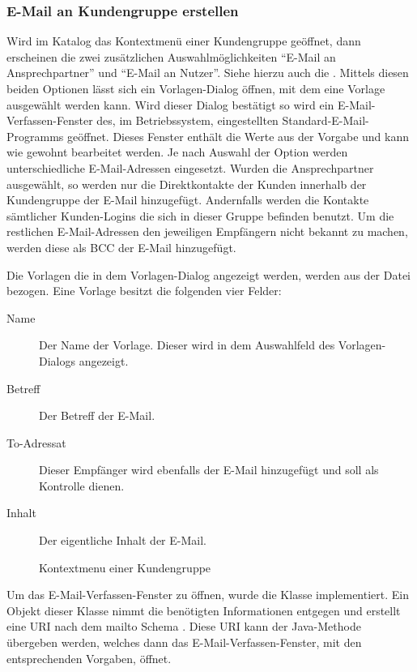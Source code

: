 \subsubsection{E-Mail an Kundengruppe erstellen}
Wird im Katalog das Kontextmenü einer Kundengruppe geöffnet, dann erscheinen die zwei zusätzlichen Auswahlmöglichkeiten "`E-Mail an Ansprechpartner"' und "`E-Mail an Nutzer"'.
Siehe hierzu auch die .
Mittels diesen beiden Optionen lässt sich ein Vorlagen-Dialog öffnen, mit dem eine Vorlage ausgewählt werden kann.
Wird dieser Dialog bestätigt so wird ein E-Mail-Verfassen-Fenster des, im Betriebssystem, eingestellten Standard-E-Mail-Programms geöffnet.
Dieses Fenster enthält die Werte aus der Vorgabe und kann wie gewohnt bearbeitet werden.
Je nach Auswahl der Option werden unterschiedliche E-Mail-Adressen eingesetzt.
Wurden die Ansprechpartner ausgewählt, so werden nur die Direktkontakte der Kunden innerhalb der Kundengruppe der E-Mail hinzugefügt.
Andernfalls werden die Kontakte sämtlicher Kunden-Logins die sich in dieser Gruppe befinden benutzt.
Um die restlichen E-Mail-Adressen den jeweiligen Empfängern nicht bekannt zu machen, werden diese als BCC der E-Mail hinzugefügt.

Die Vorlagen die in dem Vorlagen-Dialog angezeigt werden, werden aus der Datei  bezogen. Eine Vorlage besitzt die folgenden vier Felder:
\begin{description}
\item[Name] Der Name der Vorlage. Dieser wird in dem Auswahlfeld des Vorlagen-Dialogs angezeigt.
\item[Betreff] Der Betreff der E-Mail.
\item[To-Adressat] Dieser Empfänger wird ebenfalls der E-Mail hinzugefügt und soll als Kontrolle dienen.
\item[Inhalt] Der eigentliche Inhalt der E-Mail.
\end{description}

\begin{figure}[htb]
	\centering
	\caption{Kontextmenu einer Kundengruppe}
	\label{fig:gui-kundengruppe-context}
\end{figure}
Um das E-Mail-Verfassen-Fenster zu öffnen, wurde die Klasse  implementiert.
Ein Objekt dieser Klasse nimmt die benötigten Informationen entgegen und erstellt eine URI nach dem mailto Schema \autocite{RFC2368}.
Diese URI kann der Java-Methode  \autocite{java-mailto} übergeben werden, welches dann das E-Mail-Verfassen-Fenster, mit den entsprechenden Vorgaben, öffnet.

